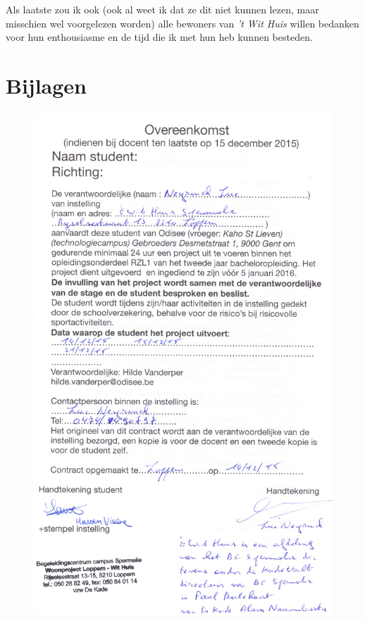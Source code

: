 \documentclass[a4paper,12pt]{article}
\begin{document}
Als laatste zou ik ook (ook al weet ik dat ze dit niet kunnen lezen, maar misschien wel voorgelezen worden) alle bewoners van \emph{'t Wit Huis} willen bedanken voor hun enthousiasme en de tijd die ik met hun heb kunnen besteden.

\newpage

\section{Bijlagen}

\begin{figure}[H]
  \centering
  \includegraphics[width=\textwidth,height=0.9\textheight,keepaspectratio]{./contract.jpg}
\end{figure}
\end{document}
